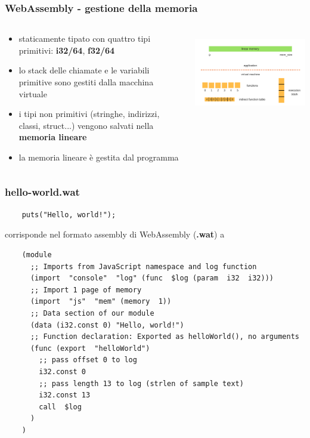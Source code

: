 \documentclass{beamer}
\newcommand\Fontvi{\fontsize{9.5}{7.2}\selectfont}
\begin{document}
\begin{frame}
  \frametitle{WebAssembly - gestione della memoria}
  \begin{columns}
    \begin{column}{0.6\textwidth}
  \begin{itemize}
    \item staticamente tipato con quattro tipi primitivi: \textbf{i32/64},
      \textbf{f32/64}
      \item lo stack delle chiamate e le variabili primitive sono gestiti dalla macchina virtuale
    \item i tipi non primitivi (stringhe, indirizzi, classi, struct...) vengono
      salvati nella \textbf{memoria lineare}
    \item la memoria lineare è gestita dal programma
  \end{itemize} 
  \end{column}
    \begin{column}{0.4\textwidth}
  \centerline{\includegraphics[width=10cm,height=3.5cm,keepaspectratio]{images/linmem.png}}
    \end{column}
  \end{columns}
\end{frame}

\begin{frame}[fragile]
  \frametitle{hello-world.wat}
  \Fontvi
  \begin{verbatim}
    puts("Hello, world!");
  \end{verbatim}

  \vspace{0.2in}
  \centerline{corrisponde nel formato assembly di WebAssembly  (\textbf{.wat}) a}
  \vspace{0.2in}

  \begin{verbatim}
    (module
      ;; Imports from JavaScript namespace and log function
      (import  "console"  "log" (func  $log (param  i32  i32)))
      ;; Import 1 page of memory
      (import  "js"  "mem" (memory  1))
      ;; Data section of our module
      (data (i32.const 0) "Hello, world!")
      ;; Function declaration: Exported as helloWorld(), no arguments
      (func (export  "helloWorld")
        ;; pass offset 0 to log
        i32.const 0
        ;; pass length 13 to log (strlen of sample text)
        i32.const 13          
        call  $log
      )
    ) 
  \end{verbatim}
\end{frame}
\end{document}
